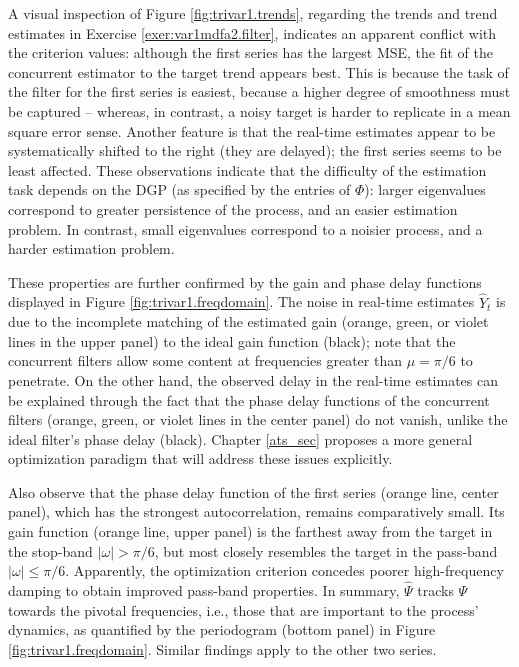 \documentclass[a4paper]{book}
\begin{document}
A visual inspection of Figure \ref{fig:trivar1.trends}, regarding
the trends and trend estimates in Exercise 
 \ref{exer:var1mdfa2.filter}, indicates an apparent conflict with the 
 criterion values: although the first series has the largest MSE,
 the fit of the concurrent estimator to the target trend appears best.
 This is because the task of the filter for the first series is
 easiest, because a higher degree of smoothness must be captured --
 whereas, in contrast, a noisy target is harder to replicate in a
 mean square error sense. Another feature is that the real-time
 estimates appear  to be systematically 
shifted to the right (they are delayed); the first series seems to be least
 affected.   These observations indicate that the difficulty of the estimation 
  task  depends on the DGP (as specified by the entries of $\Phi$):
 larger eigenvalues correspond to greater persistence of the process, 
  and an easier estimation problem.  In contrast, small eigenvalues 
 correspond to a noisier process, and a harder estimation problem.
 
 These properties are further confirmed by the gain and phase delay
 functions displayed   in Figure \ref{fig:trivar1.freqdomain}.   
 The noise  in real-time estimates $\widehat{Y}_t$  
 is due to the incomplete matching of the estimated gain (orange, green, or
 violet lines in the upper panel) to the ideal gain function (black); 
  note that the concurrent
 filters allow some   content at frequencies greater than $\mu = \pi/6$
 to penetrate.  On the other hand, the observed delay in the real-time
 estimates can be explained through the fact that the phase delay functions
 of the concurrent filters (orange, green, or
 violet lines in the center panel) do not vanish, unlike the ideal
 filter's phase delay (black).    Chapter \ref{ats_sec} 
proposes a more general optimization paradigm that will address these issues 
explicitly.

 Also observe that the phase delay function of the first series
 (orange line, center panel), which has the strongest autocorrelation,
  remains comparatively small. Its gain function (orange line, upper panel) 
 is the farthest away from the target in the stop-band $|\omega| >\pi/6$,
   but most closely resembles the target in the pass-band 
	$|\omega| \leq\pi/6$.
  Apparently,  the optimization criterion concedes
 poorer high-frequency damping to obtain improved pass-band properties. 
 In summary, $\widehat{\Psi}$ tracks $\Psi$ towards the pivotal
 frequencies, i.e., those that are important to the process'
 dynamics, as quantified by the periodogram (bottom panel) in 
 Figure \ref{fig:trivar1.freqdomain}.  
Similar findings apply to the other two series.
\end{document}
